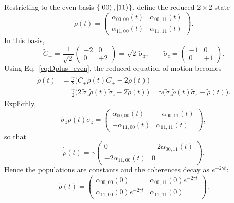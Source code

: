 Restricting to the even basis $\{\ket{00},\ket{11}\}$, define the reduced $2\times2$ state
\begin{equation}
	\tilde\rho(t)=
	\begin{pmatrix}
		\alpha_{00,00}(t) & \alpha_{00,11}(t)\\
		\alpha_{11,00}(t) & \alpha_{11,11}(t)
	\end{pmatrix}.
\end{equation}
In this basis,
\begin{equation}
	\tilde C_+
	=\frac{1}{\sqrt{2}}
	\begin{pmatrix}
		-2 & 0\\
		0 & +2
	\end{pmatrix}
	=\sqrt{2}\,\tilde\sigma_z,
	\qquad
	\tilde\sigma_z=
	\begin{pmatrix}
		-1&0\\
		0&+1
	\end{pmatrix}.
\end{equation}
Using Eq.~\eqref{eq:Dplus_even}, the reduced equation of motion becomes
\begin{align}
	\dot{\tilde\rho}(t)
	&=\frac{\gamma}{2}\Big(\tilde C_+ \tilde\rho(t)\tilde C_+-2\tilde\rho(t)\Big)\nonumber\\
	&=\frac{\gamma}{2}\Big(2\,\tilde\sigma_z\tilde\rho(t)\tilde\sigma_z-2\tilde\rho(t)\Big)
	=\gamma\Big(\tilde\sigma_z\tilde\rho(t)\tilde\sigma_z-\tilde\rho(t)\Big).
	\label{eq:reduced_ME_even}
\end{align}
Explicitly,
\begin{equation}
	\tilde\sigma_z\tilde\rho(t)\tilde\sigma_z
	=
	\begin{pmatrix}
		\alpha_{00,00}(t) & -\alpha_{00,11}(t)\\
		-\alpha_{11,00}(t) & \alpha_{11,11}(t)
	\end{pmatrix},
\end{equation}
so that
\begin{equation}
	\dot{\tilde\rho}(t)
	=
	\gamma
	\begin{pmatrix}
		0 & -2\alpha_{00,11}(t)\\
		-2\alpha_{11,00}(t) & 0
	\end{pmatrix}.
\end{equation}
Hence the populations are constants and the coherences decay as $e^{-2\gamma t}$:
\begin{equation}
	\tilde\rho(t)=
	\begin{pmatrix}
		\alpha_{00,00}(0) & \alpha_{00,11}(0)e^{-2\gamma t}\\
		\alpha_{11,00}(0)e^{-2\gamma t} & \alpha_{11,11}(0)
	\end{pmatrix}.
	\label{eq:reduced_solution_even}
\end{equation}
